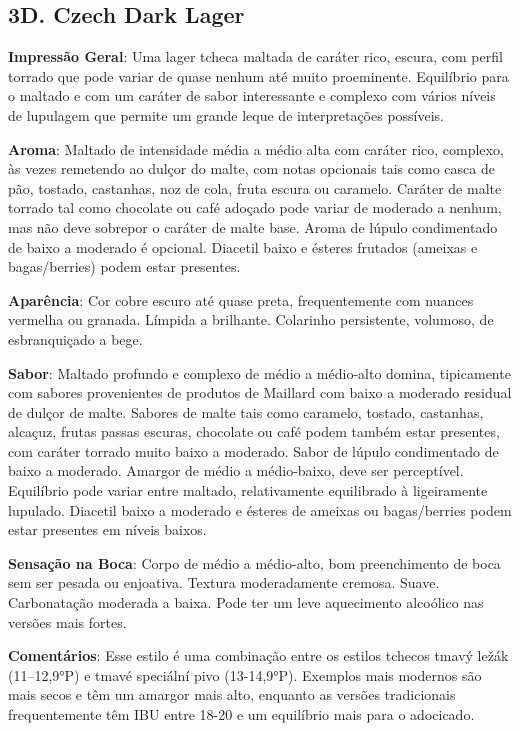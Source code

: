 \subsection*{3D. Czech Dark Lager}
\textbf{Impressão Geral}: Uma lager tcheca maltada de caráter rico, escura, com perfil torrado que pode variar de quase nenhum até muito proeminente. Equilíbrio para o maltado e com um caráter de sabor interessante e complexo com vários níveis de lupulagem que permite um grande leque de interpretações possíveis.

\textbf{Aroma}: Maltado de intensidade média a médio alta com caráter rico, complexo, às vezes remetendo ao dulçor do malte, com notas opcionais tais como casca de pão, tostado, castanhas, noz de cola, fruta escura ou caramelo. Caráter de malte torrado tal como chocolate ou café adoçado pode variar de moderado a nenhum, mas não deve sobrepor o caráter de malte base. Aroma de lúpulo condimentado de baixo a moderado é opcional. Diacetil baixo e ésteres frutados (ameixas e bagas/berries) podem estar presentes.

\textbf{Aparência}: Cor cobre escuro até quase preta, frequentemente com nuances vermelha ou granada. Límpida a brilhante. Colarinho persistente, volumoso, de esbranquiçado a bege.

\textbf{Sabor}: Maltado profundo e complexo de médio a médio-alto domina, tipicamente com sabores provenientes de produtos de Maillard com baixo a moderado residual de dulçor de malte. Sabores de malte tais como caramelo, tostado, castanhas, alcaçuz, frutas passas escuras, chocolate ou café podem também estar presentes, com caráter torrado muito baixo a moderado. Sabor de lúpulo condimentado de baixo a moderado. Amargor de médio a médio-baixo, deve ser perceptível. Equilíbrio pode variar entre maltado, relativamente equilibrado à ligeiramente lupulado. Diacetil baixo a moderado e ésteres de ameixas ou bagas/berries podem estar presentes em níveis baixos.

\textbf{Sensação na Boca}: Corpo de médio a médio-alto, bom preenchimento de boca sem ser pesada ou enjoativa. Textura moderadamente cremosa. Suave. Carbonatação moderada a baixa. Pode ter um leve aquecimento alcoólico nas versões mais fortes.

\textbf{Comentários}: Esse estilo é uma combinação entre os estilos tchecos tmavý ležák (11–12,9°P) e tmavé speciální pivo (13-14,9°P). Exemplos mais modernos são mais secos e têm um amargor mais alto, enquanto as versões tradicionais frequentemente têm IBU entre 18-20 e um equilíbrio mais para o adocicado.


